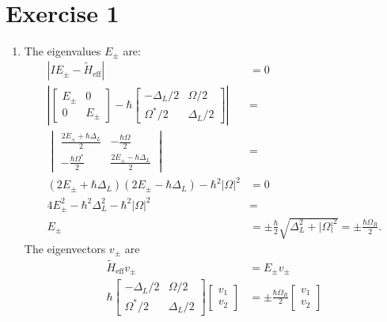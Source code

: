 \documentclass[letterpaper,11pt,twoside]{article}
\title{\textbf{\assignment}\\\course\\{\Large\institution}}
\author{\autor}
\begin{document}
\pagestyle{mainstyle}
\maketitle
\section*{Exercise 1}
\begin{enumerate}[itemsep=0pt,topsep=0pt,parsep=0pt,label=\alph*)]
  \item The eigenvalues $E_\pm$ are:
  \begin{align*}
    |IE_\pm-\tilde{H}_{\mathrm{eff}}|&=0\\
    \left|\begin{bmatrix}
      E_\pm&0\\0&E_\pm
    \end{bmatrix}-\hbar\begin{bmatrix}
      -\Delta_L/2&\Omega/2\\\Omega^*/2&\Delta_L/2
    \end{bmatrix}\right|&=\\
    \begin{vmatrix}
    \frac{2E_\pm+\hbar\Delta_L}{2}&-\frac{\hbar\Omega}{2}\\
    -\frac{\hbar\Omega^*}{2}&\frac{2E_\pm-\hbar\Delta_L}{2}
    \end{vmatrix}&=\\
    (2E_\pm+\hbar\Delta_L)(2E_\pm-\hbar\Delta_L)-\hbar^2|\Omega|^2&=0\\
    4E_\pm^2-\hbar^2\Delta_L^2-\hbar^2|\Omega|^2&=\\
    E_\pm&=\pm\frac{\hbar}{2}\sqrt{\Delta_L^2+|\Omega|^2}=\pm\frac{\hbar\Omega_R}{2}.
  \end{align*}
  The eigenvectors $v_\pm$ are
  \begin{align*}
    \tilde{H}_{\mathrm{eff}}v_\pm&=E_\pm v_\pm\\
    \hbar\begin{bmatrix}
      -\Delta_L/2&\Omega/2\\\Omega^*/2&\Delta_L/2
    \end{bmatrix}\begin{bmatrix}
      v_1\\v_2
    \end{bmatrix}&=\pm\frac{\hbar\Omega_R}{2}\begin{bmatrix}
      v_1\\v_2
    \end{bmatrix}\\

\end{align*}
\end{enumerate}
\end{document}
